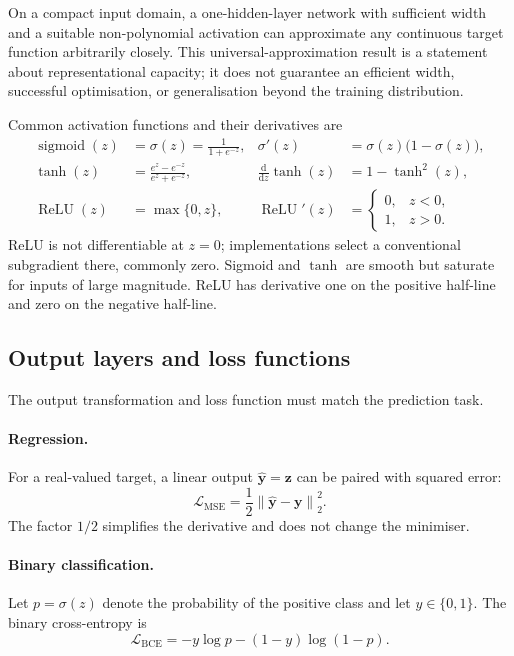 On a compact input domain, a one-hidden-layer network with sufficient width and
a suitable non-polynomial activation can approximate any continuous target
function arbitrarily closely. This universal-approximation result is a statement
about representational capacity; it does not guarantee an efficient width,
successful optimisation, or generalisation beyond the training distribution.

Common activation functions and their derivatives are
\begin{align*}
    \operatorname{sigmoid}(z)
    &=\sigma(z)=\frac{1}{1+e^{-z}},
    & \sigma'(z)&=\sigma(z)\bigl(1-\sigma(z)\bigr),\\
    \tanh(z)
    &=\frac{e^z-e^{-z}}{e^z+e^{-z}},
    & \frac{\mathrm{d}}{\mathrm{d}z}\tanh(z)&=1-\tanh^2(z),\\
    \operatorname{ReLU}(z)
    &=\max\{0,z\},
    & \operatorname{ReLU}'(z)&=
    \begin{cases}
        0,&z<0,\\
        1,&z>0.
    \end{cases}
\end{align*}
ReLU is not differentiable at \(z=0\); implementations select a conventional subgradient there, commonly zero. Sigmoid and \(\tanh\) are smooth but saturate for inputs of large magnitude. ReLU has derivative one on the positive half-line and zero on the negative half-line.

\subsection{Output layers and loss functions}

The output transformation and loss function must match the prediction task.

\paragraph{Regression.}
For a real-valued target, a linear output \(\widehat{\mathbf{y}}=\mathbf{z}\) can be paired with squared error:
\[
    \mathcal{L}_{\mathrm{MSE}}
    =\frac{1}{2}\left\lVert
    \widehat{\mathbf{y}}-\mathbf{y}
    \right\rVert_2^2.
\]
The factor \(1/2\) simplifies the derivative and does not change the minimiser.

\paragraph{Binary classification.}
Let \(p=\sigma(z)\) denote the probability of the positive class and let \(y\in\{0,1\}\). The binary cross-entropy is
\[
    \mathcal{L}_{\mathrm{BCE}}
    =-y\log p-(1-y)\log(1-p).
\]

